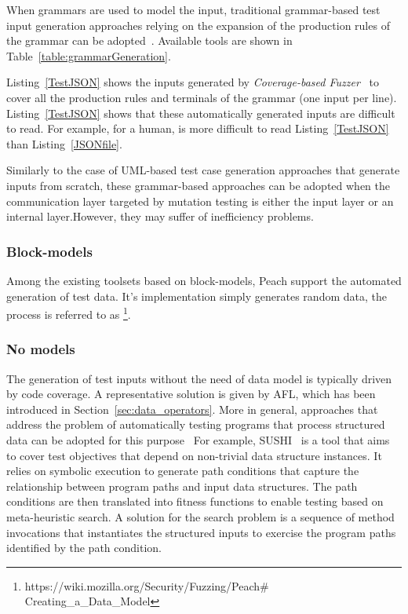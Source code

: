 When grammars are used to model the input, traditional grammar-based test input generation approaches relying on the expansion of the production rules of the grammar can be adopted~\cite{fuzzingbook2019:GrammarFuzzer}. 
Available tools are shown in Table~\ref{table:grammarGeneration}.

Listing~\ref{TestJSON} shows the inputs generated by \emph{Coverage-based Fuzzer}~\cite{fuzzingbook2019:GrammarFuzzer} to cover all the production rules and terminals of the grammar (one input per line). Listing~\ref{TestJSON} shows that these automatically generated inputs are difficult to read. For example, for a human, is more difficult to  read Listing~\ref{TestJSON}  than Listing~\ref{JSONfile}.





Similarly to the case of UML-based test case generation approaches that generate inputs from scratch, these grammar-based approaches can be adopted when the communication layer targeted by mutation testing is either the input layer or an internal layer.However, they may suffer of inefficiency problems.


\subsubsection{Block-models}

Among the existing toolsets based on block-models, Peach support the automated generation of test data. It's implementation simply generates random data, the process is referred to as 
\footnote{https://wiki.mozilla.org/Security/Fuzzing/Peach$\#$Creating\_a\_Data\_Model}.


\subsubsection{No models}


The generation of test inputs without the need of data model is typically driven by code coverage. A representative solution is given by AFL, which has been introduced in Section~\ref{sec:data_operators}. More in general, approaches that address the problem of automatically testing programs that process structured data can be adopted for this purpose~\cite{Kiran:2008,Braione:2017,Braione:2018} For example, SUSHI~\cite{Braione:2018} is a tool that aims to cover test objectives that depend on non-trivial data structure instances. 
It relies on symbolic execution to generate path conditions that capture the relationship between program paths and input data structures. The path conditions are then translated into fitness functions to enable testing based on meta-heuristic search. A solution for the search problem is a sequence of method invocations that instantiates the structured inputs to exercise the program paths identified by the path condition. 

\endinput

